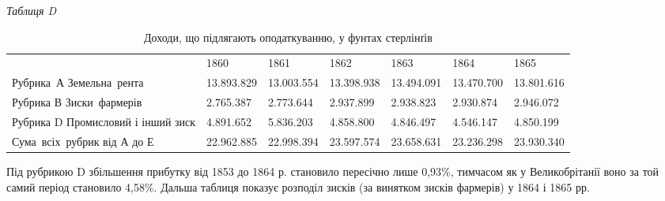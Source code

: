 \begin{table}
\begin{flushright}
  \emph{Таблиця D}
\end{flushright}

\caption*{Доходи, що підлягають оподаткуванню, у фунтах стерлінґів}
\footnotesize
  \noindent\begin{tabularx}{\textwidth}{p{2cm} X X X X X X}

  \toprule
& 1860 & 1861 & 1862 & 1863 & 1864 & 1865 \\
\cmidrule{2-7}
\mbox{Рубрика А}
\mbox{Земельна рента} & 13.893.829 & 13.003.554 & 13.398.938 & 13.494.091 & 13.470.700
& 13.801.616 \\
Рубрика В
\mbox{Зиски фармерів} & 2.765.387 & 2.773.644 & 2.937.899 & 2.938.823 & 2.930.874 & 2.946.072 \\
Рубрика D
\mbox{Промисловий} і інший зиск & 4.891.652 & 5.836.203 & 4.858.800 & 4.846.497 & 4.546.147 & 4.850.199 \\
\mbox{Сума всіх рубрик}
від А до Е & 22.962.885 & 22.998.394 & 23.597.574 & 23.658.631 & 23.236.298 &    23.930.340\footnotemark{} %
\\

  \end{tabularx}

\end{table}

Під рубрикою D збільшення прибутку від 1853 до 1864 р.
становило пересічно лише 0,93\%, тимчасом як у Великобрітанії
воно за той самий період становило 4,58\%. Дальша таблиця показує
розподіл зисків (за винятком зисків фармерів) у 1864 і
1865 рр.

